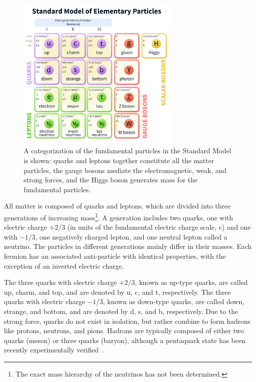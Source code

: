 \begin{figure}[htb]
\begin{center}
\includegraphics[width=0.7\textwidth]{figures/StandardModel/std_model}
\end{center}
\caption[Fundamental particles in the Standard Model]{A categorization of the fundamental particles in the Standard Model is shown: quarks and leptons together constitute all the matter particles, the gauge bosons mediate the electromagnetic, weak, and strong forces, and the Higgs boson generates mass for the fundamental particles.}
\label{fig:st_m_p}
\end{figure}

All matter is composed of quarks and leptons, which are divided into three generations of increasing mass\footnote{
	The exact mass hierarchy of the neutrinos has not been determined.
}. A generation includes two quarks, one with electric charge $+2/3$ (in units of the fundamental electric charge scale, $e$) and one with $-1/3$, one negatively charged lepton, and one neutral lepton called a neutrino. The particles in different generations mainly differ in their masses. Each fermion has an associated anti-particle with identical properties, with the exception of an inverted electric charge.

The three quarks with electric charge $+2/3$, known as up-type quarks, are called up, charm, and top, and are denoted by u, c, and t, respectively. The three quarks with electric charge $-1/3$, known as down-type quarks, are called down, strange, and bottom, and are denoted by d, s, and b, respectively. Due to the strong force, quarks do not exist in isolation, but rather combine to form hadrons like protons, neutrons, and pions. Hadrons are typically composed of either two quarks (meson) or three quarks (baryon), although a pentaquark state has been recently experimentally verified~\cite{pentaquark}.

